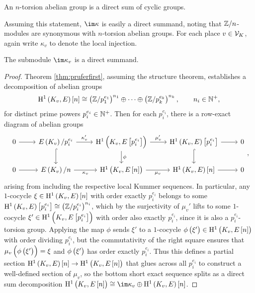 \begin{theorem}
\label{thm:pruferfirst}
An $ n $-torsion abelian group is a direct sum of cyclic groups.
\end{theorem}

Assuming this statement, $ \im \kappa $ is easily a direct summand, noting that $ \mathbb{Z} / n $-modules are synonymous with $ n $-torsion abelian groups. For each place $ v \in \mathcal{V}_K $, again write $ \kappa_v $ to denote the local injection.

\begin{proposition}
\label{prop:localsummand}
The submodule $ \im \kappa_v $ is a direct summand.
\end{proposition}

\begin{proof}
Theorem \ref{thm:pruferfirst}, assuming the structure theorem, establishes a decomposition of abelian groups
$$ \HE{K_v}\sbr{n} \cong \br{\ZZ / p_1^{e_1}}^{n_1} \oplus \dots \oplus \br{\ZZ / p_k^{e_k}}^{n_k}, \qquad n_i \in \NN^+, $$
for distinct prime powers $ p_i^{e_i} \in \mathbb{N}^+ $. Then for each $ p_i^{e_i} $, there is a row-exact diagram of abelian groups
$$
\begin{tikzcd}
0 \arrow{r} & \En[p_i^{e_i}]{K_v} \arrow{r}{\kappa_v'} \arrow[hookrightarrow]{d} & \HE[p_i^{e_i}]{K_v} \arrow{r}{\mu_v'} \arrow{d}{\phi} & \HE{K_v}\sbr{p_i^{e_i}} \arrow{r} \arrow[hookrightarrow]{d} & 0 \\
0 \arrow{r} & \En{K_v} \arrow{r}[swap]{\kappa_v} & \HE[n]{K_v} \arrow{r}[swap]{\mu_v} & \HE{K_v}\sbr{n} \arrow{r} & 0
\end{tikzcd},
$$
arising from including the respective local Kummer sequences. In particular, any $ 1 $-cocycle $ \xi \in \HE{K_v}\sbr{n} $ with order exactly $ p_i^{e_i} $ belongs to some $ \HE{K_v}\sbr{p_i^{e_i}} \cong \br{\ZZ / p_i^{e_i}}^{n_i} $, which by the surjectivity of $ \mu_v' $ lifts to some $ 1 $-cocycle $ \xi' \in \HE[p_i^{e_i}]{K_v} $ with order also exactly $ p_i^{e_i} $, since it is also a $ p_i^{e_i} $-torsion group. Applying the map $ \phi $ sends $ \xi' $ to a $ 1 $-cocycle $ \phi\br{\xi'} \in \HE[n]{K_v} $ with order dividing $ p_i^{e_i} $, but the commutativity of the right square ensures that $ \mu_v\br{\phi\br{\xi'}} = \xi $ and $ \phi\br{\xi'} $ has order exactly $ p_i^{e_i} $. Thus this defines a partial section $ \HE{K_v}\sbr{n} \to \HE[n]{K_v} $ that glues across all $ p_i^{e_i} $ to construct a well-defined section of $ \mu_v $, so the bottom short exact sequence splits as a direct sum decomposition $ \HE[n]{K_v} \cong \im \kappa_v \oplus \HE{K_v}\sbr{n} $.
\end{proof}

